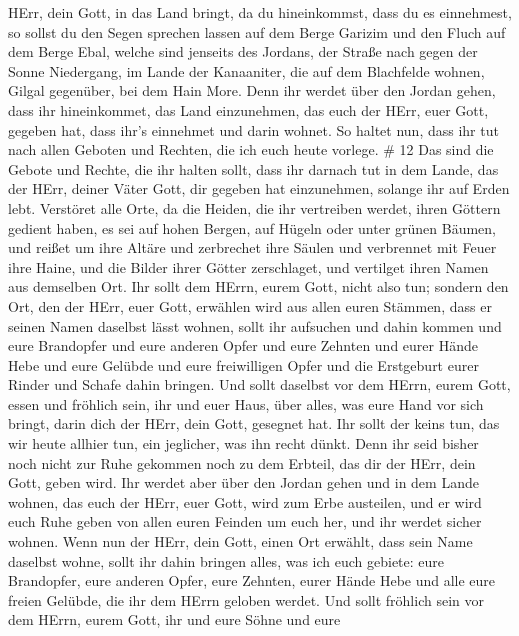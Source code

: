 HErr, dein Gott, in das Land bringt, da du hineinkommst, dass du es
einnehmest, so sollst du den Segen sprechen lassen auf dem Berge Garizim
und den Fluch auf dem Berge Ebal,  welche sind jenseits des
Jordans, der Straße nach gegen der Sonne Niedergang, im Lande der
Kanaaniter, die auf dem Blachfelde wohnen, Gilgal gegenüber, bei dem
Hain More.  Denn ihr werdet über den Jordan gehen, dass ihr
hineinkommet, das Land einzunehmen, das euch der HErr, euer Gott,
gegeben hat, dass ihr's einnehmet und darin wohnet.  So
haltet nun, dass ihr tut nach allen Geboten und Rechten, die ich euch
heute vorlege. \# 12  Das sind die Gebote und Rechte, die
ihr halten sollt, dass ihr darnach tut in dem Lande, das der HErr,
deiner Väter Gott, dir gegeben hat einzunehmen, solange ihr auf Erden
lebt.  Verstöret alle Orte, da die Heiden, die ihr
vertreiben werdet, ihren Göttern gedient haben, es sei auf hohen Bergen,
auf Hügeln oder unter grünen Bäumen,  und reißet um ihre
Altäre und zerbrechet ihre Säulen und verbrennet mit Feuer ihre Haine,
und die Bilder ihrer Götter zerschlaget, und vertilget ihren Namen aus
demselben Ort.  Ihr sollt dem HErrn, eurem Gott, nicht also
tun;  sondern den Ort, den der HErr, euer Gott, erwählen
wird aus allen euren Stämmen, dass er seinen Namen daselbst lässt
wohnen, sollt ihr aufsuchen und dahin kommen  und eure
Brandopfer und eure anderen Opfer und eure Zehnten und eurer Hände Hebe
und eure Gelübde und eure freiwilligen Opfer und die Erstgeburt eurer
Rinder und Schafe dahin bringen.  Und sollt daselbst vor dem
HErrn, eurem Gott, essen und fröhlich sein, ihr und euer Haus, über
alles, was eure Hand vor sich bringt, darin dich der HErr, dein Gott,
gesegnet hat.  Ihr sollt der keins tun, das wir heute
allhier tun, ein jeglicher, was ihn recht dünkt.  Denn ihr
seid bisher noch nicht zur Ruhe gekommen noch zu dem Erbteil, das dir
der HErr, dein Gott, geben wird.  Ihr werdet aber über den
Jordan gehen und in dem Lande wohnen, das euch der HErr, euer Gott, wird
zum Erbe austeilen, und er wird euch Ruhe geben von allen euren Feinden
um euch her, und ihr werdet sicher wohnen.  Wenn nun der
HErr, dein Gott, einen Ort erwählt, dass sein Name daselbst wohne, sollt
ihr dahin bringen alles, was ich euch gebiete: eure Brandopfer, eure
anderen Opfer, eure Zehnten, eurer Hände Hebe und alle eure freien
Gelübde, die ihr dem HErrn geloben werdet.  Und sollt
fröhlich sein vor dem HErrn, eurem Gott, ihr und eure Söhne und eure
